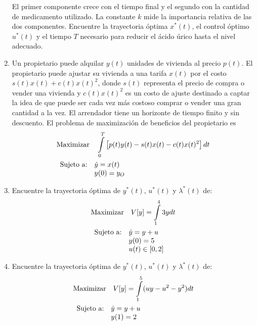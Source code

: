 \documentclass[10pt,a4paper]{article}
\begin{document}
\begin{enumerate}
		El primer componente crece con el tiempo final y el segundo con la cantidad de medicamento utilizado. La constante $k$ mide la importancia relativa de las dos componentes. Encuentre la trayectoria óptima $x^\ast(t)$, el control óptimo $u^\ast(t)$ y el tiempo $T$ necesario para reducir el ácido úrico hasta el  nivel  adecuado.
		\item Un propietario puede alquilar $ y (t) $ unidades de vivienda al precio $ 
		p (t) $. El propietario puede ajustar su vivienda a una tarifa $ x (t) $ por 
		el costo $ s (t) x (t) + c (t) x (t) ^ 2 $, donde $ s (t) $ representa el 
		precio de compra o vender una vivienda y $ c (t) x (t) ^ 2 $ es un costo de 
		ajuste destinado a captar la idea de que puede ser cada vez más costoso 
		comprar o vender una gran cantidad a la vez. El arrendador tiene un horizonte 
		de tiempo finito y sin descuento. El problema de maximización de beneficios 
		del propietario es
		\begin{align*}
			&\textup{Maximizar}\quad \int\limits_{0}^{T}\left[ p(t)y(t)-s(t)x(t)-c(t)x(t)^2\right]dt\\
			&\begin{array}{lllll}
				\textup{Sujeto a:}	&	\dot{y}=x(t) \\
				&	y(0)=y_O
			\end{array}
		\end{align*}
		\item Encuentre la trayectoria óptima de $y^\ast(t)$, $u^\ast(t)$ y $\lambda^\ast(t)$ de:
		\begin{align*}
			&\textup{Maximizar}\quad V[y]=\int\limits_{1}^{4}3ydt\\
			&\begin{array}{lllll}
				\textup{Sujeto a:}	&	\dot{y}=y+u \\
				&	y(0)=5 \\
				&	u(t) \in [0,2]
			\end{array}
		\end{align*}
		\item Encuentre la trayectoria óptima de $y^\ast(t)$, $u^\ast(t)$ y $\lambda^\ast(t)$ de:
		\begin{align*}
			&\textup{Maximizar}\quad V[y]=\int\limits_{1}^{5}(uy-u^2-y^2)dt\\
			&\begin{array}{lllll}
				\textup{Sujeto a:}	&	\dot{y}=y+u \\
				&	y(1)=2
			\end{array}
		\end{align*}
	\end{enumerate}
\end{document}
